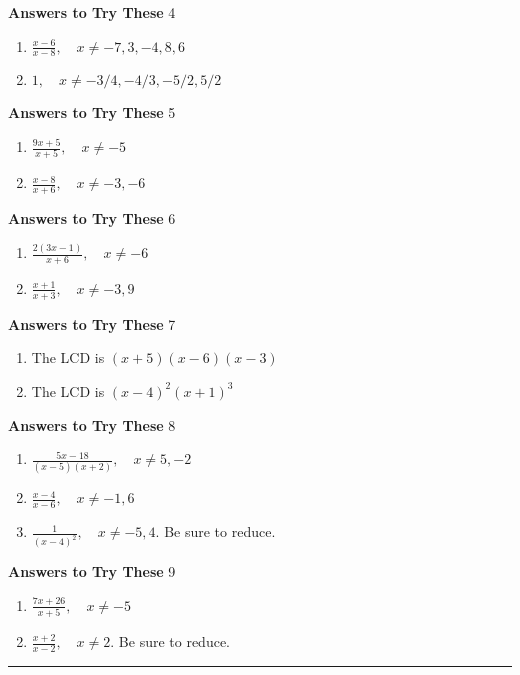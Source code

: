 \documentclass[a4paper]{JAC2003}
\begin{document}
\noindent\textcolor{red!75!black}{\textbf{Answers to Try These}} 4
\begin{enumerate}
\item $\frac{x-6}{x-8}, \quad x \neq-7,3,-4,8,6$ 

\item $1, \quad x \neq-3 / 4,-4 / 3,-5 / 2,5 / 2$
\end{enumerate}

\noindent\textcolor{red!75!black}{\textbf{Answers to Try These}} 5
\begin{enumerate}
\item $\frac{9 x+5}{x+5}, \quad x \neq-5$

\item $\frac{x-8}{x+6}, \quad x \neq-3,-6$
\end{enumerate}

\noindent\textcolor{red!75!black}{\textbf{Answers to Try These}} 6
\begin{enumerate}
\item $\frac{2(3 x-1)}{x+6}, \quad x \neq-6$

\item $\frac{x+1}{x+3}, \quad x \neq-3,9$
\end{enumerate}

\noindent\textcolor{red!75!black}{\textbf{Answers to Try These}} 7
\begin{enumerate}
\item The LCD is $(x+5)(x-6)(x-3)$

\item The LCD is $(x-4)^{2}(x+1)^{3}$
\end{enumerate}

\noindent\textcolor{red!75!black}{\textbf{Answers to Try These}} 8
\begin{enumerate}
\item $\frac{5 x-18}{(x-5)(x+2)}, \quad x \neq 5,-2$

\item $\frac{x-4}{x-6}, \quad x \neq-1,6$

\item $\frac{1}{(x-4)^{2}}, \quad x \neq-5,4$. Be sure to reduce.
\end{enumerate}

\noindent\textcolor{red!75!black}{\textbf{Answers to Try These}} 9
\begin{enumerate}
\item $\frac{7 x+26}{x+5}, \quad x \neq-5$

\item $\frac{x+2}{x-2}, \quad x \neq 2 .$ Be sure to reduce. %
\end{enumerate}
\noindent\rule[0.5ex]{\linewidth}{1pt}
\end{document}
